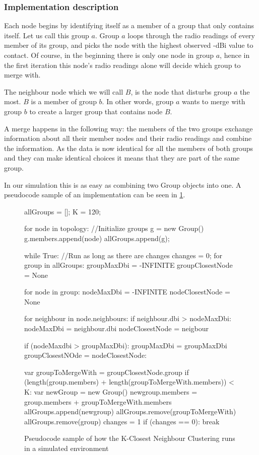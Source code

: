 \subsubsection{Implementation description}
Each node begins by identifying itself as a member of a group that only contains itself. Let us call this group $a$.
Group $a$ loops through the radio readings of every member of its group, and picks the node with the highest observed -dBi value
to contact. Of course, in the beginning there is only one node in group $a$, hence in the first iteration this node's radio readings alone will decide which group to merge with. 

The neighbour node which we will call $B$, is the node that disturbs group $a$ the most. $B$ is a member of group $b$.
In other words, group $a$ wants to merge with group $b$ to create a larger group that contains node $B$.

A merge happens in the following way: the members of the two groups exchange information about all their member nodes and their radio readings and combine the information.
As the data is now identical for all the members of both groups and they can make identical choices it means that they are part of the same group. 

In our simulation this is as easy as combining two Group objects into one. A pseudocode sample of an implementation can be seen in \ref{fig:groupmerge}.

	\begin{figure}
		\tiny
		\begin{python}
allGroups = [];
K = 120;

for node in topology: //Initialize groups
	g = new Group()
	g.members.append(node)
	allGroups.append(g);

while True: //Run as long as there are changes
	changes = 0;	
	for group in allGroups: 
		groupMaxDbi = -INFINITE
		groupClosestNode = None

		for node in group:
			nodeMaxDbi = -INFINITE
			nodeClosestNode = None

			for neighbour in node.neighbours:
				if neighbour.dbi > nodeMaxDbi:
					nodeMaxDbi = neighbour.dbi
					nodeClosestNode = neigbour

			if (nodeMaxdbi > groupMaxDbi):
				groupMaxDbi = groupMaxDbi
				groupClosestNOde = nodeClosestNode:

		var groupToMergeWith = groupClosestNode.group
		if (length(group.members) + length(groupToMergeWith.members)) < K:
			var newGroup = new Group()
			newgroup.members = group.members + groupToMergeWith.members
			allGroups.append(newgroup)
			allGroups.remove(groupToMergeWith)
			allGroups.remove(group)
			changes = 1
	if (changes == 0):
		break
		\end{python}
			\caption{Pseudocode sample of how the K-Closest Neighbour Clustering runs in a simulated environment}
			\label{fig:groupmerge}
	\end{figure}



